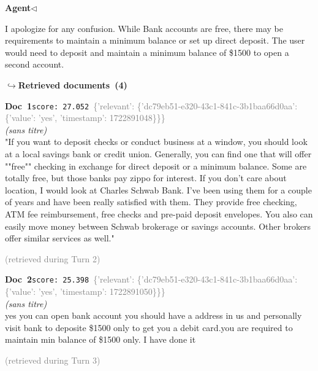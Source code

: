 \documentclass[a4paper,11pt]{article}
\begin{document}
\noindent\hfill{\small\textcolor{agentcolor}{\textbf{Agent\enspace$\triangleleft$}}}
\begin{agentbubble}
I apologize for any confusion. While Bank accounts are free, there may be requirements to maintain a minimum balance or set up direct deposit. The user would need to deposit and maintain a minimum balance of \$1500 to open a second account. 
\end{agentbubble}
\noindent\hfill{\footnotesize\textcolor{doccolor}{\textbf{$\hookrightarrow$\enspace Retrieved documents~(4)}}}
\begin{docenv}
{\footnotesize\textcolor{doccolor}{\textbf{Doc~1}}}\hfill{\tiny\texttt{score:~27.052}}\ {\tiny\textcolor{gray}{\{'relevant': \{'dc79eb51-e320-43c1-841c-3b1baa66d0aa': \{'value': 'yes', 'timestamp': 1722891048\}\}\}}}\\[3pt]
{\small\textit{(sans titre)}}\\[2pt]
\vspace{2pt}
{\footnotesize 
"If you want to deposit checks or conduct business at a window, you should look at a local savings bank or credit union. Generally, you can find one that will offer ""free"" checking in exchange for direct deposit or a minimum balance. Some are totally free, but those banks pay zippo for interest. If you don't care about location, I would look at Charles Schwab Bank. I've been using them for a couple of years and have been really satisfied with them. They provide free checking, ATM fee reimbursement, free checks and pre-paid deposit envelopes. You also can easily move money between Schwab brokerage or savings accounts. Other brokers offer similar services as well."}
\end{docenv}
\hfill{\tiny\textcolor{gray}{(retrieved during Turn 2)}}
\begin{docenv}
{\footnotesize\textcolor{doccolor}{\textbf{Doc~2}}}\hfill{\tiny\texttt{score:~25.398}}\ {\tiny\textcolor{gray}{\{'relevant': \{'dc79eb51-e320-43c1-841c-3b1baa66d0aa': \{'value': 'yes', 'timestamp': 1722891050\}\}\}}}\\[3pt]
{\small\textit{(sans titre)}}\\[2pt]
\vspace{2pt}
{\footnotesize 
yes you can open bank account you should have a address in us and personally visit bank to deposite \$1500 only to get you a debit card.you are required to maintain min balance of \$1500 only. I have done it}
\end{docenv}
\hfill{\tiny\textcolor{gray}{(retrieved during Turn 3)}}
\end{document}
